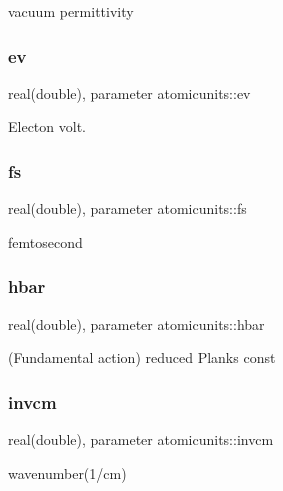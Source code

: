 vacuum permittivity 

\mbox{\label{namespaceatomicunits_a10a69964ce0d082d71ee5ae34a5a0d24}} 
\subsubsection{\texorpdfstring{ev}{ev}}
{\footnotesize\ttfamily real(double), parameter atomicunits\+::ev}



Electon volt. 

\mbox{\label{namespaceatomicunits_a51f9c61f64f3aec674dd6dbb342e733d}} 
\subsubsection{\texorpdfstring{fs}{fs}}
{\footnotesize\ttfamily real(double), parameter atomicunits\+::fs}



femtosecond 

\mbox{\label{namespaceatomicunits_a7dffaade5d28d129a3726e8eff794447}} 
\subsubsection{\texorpdfstring{hbar}{hbar}}
{\footnotesize\ttfamily real(double), parameter atomicunits\+::hbar}



(Fundamental action) reduced Planks const 

\mbox{\label{namespaceatomicunits_a1741cd0f8cdd696033c1c18531740795}} 
\subsubsection{\texorpdfstring{invcm}{invcm}}
{\footnotesize\ttfamily real(double), parameter atomicunits\+::invcm}



wavenumber(1/cm) 

